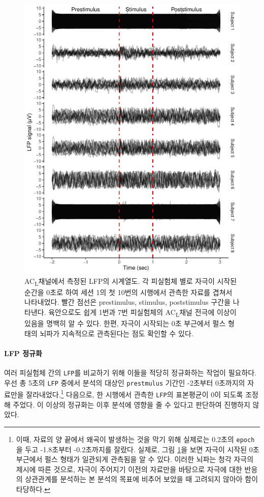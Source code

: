 \documentclass[10pt,onecolumn,twoside,a4size]{gsag3jnl}
\newcommand{\ACL}{AC\textsubscript{L}}
\begin{document}
\begin{figure}[tp]
  \renewcommand{\familydefault}{\sfdefault}\normalfont
  \centering
  \includegraphics[width=0.7\linewidth]{LFP_raw.pdf}
  \caption{\small \ACL 채널에서 측정된 LFP의 시계열도. 각 피실험체 별로 자극이 시작된 순간을 0초로 하여 세션 1의 첫 10번의 시행에서 관측한 자료를 겹쳐서 나타내었다. 빨간 점선은 prestimulus, stimulus, poststimulus 구간을 나타낸다. 육안으로도 쉽게 1번과 7번 피실험체의 \ACL 채널 전극에 이상이 있음을 명백히 알 수 있다. 한편, 자극이 시작되는 0초 부근에서 펄스 형태의 뇌파가 지속적으로 관측된다는 점도 확인할 수 있다.}
  \label{fig:LFP_raw}
\end{figure}

\paragraph{LFP 정규화}

여러 피실험체 간의 \texttt{LFP}를 비교하기 위해 이들을 적당히 정규화하는 작업이 필요하다. 우선 총 5초의 \texttt{LFP} 중에서 분석의 대상인 \texttt{prestmulus} 기간인 -2초부터 0초까지의 자료만을 잘라내었다.\footnote{이때, 자료의 양 끝에서 왜곡이 발생하는 것을 막기 위해 실제로는 0.2초의 \texttt{epoch}을 두고 -1.8초부터 -0.2초까지를 잘랐다. 실제로, 그림 \ref{fig:LFP_raw}을 보면 자극이 시작된 0초 부근에서 펄스 형태가 일관되게 관측됨을 알 수 있다. 이러한 뇌파는 청각 자극의 제시에 따른 것으로, 자극이 주어지기 이전의 자료만을 바탕으로 자극에 대한 반응의 상관관계를 분석하는 본 분석의 목표에 비추어 보았을 때 고려되지 않아아 함이 타당하다.} 다음으로, 한 시행에서 관측한 \texttt{LFP}의 표본평균이 0이 되도록 조정해 주었다. 이 이상의 정규화는 이후 분석에 영향을 줄 수 있다고 판단하여 진행하지 않았다.
\end{document}
